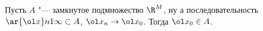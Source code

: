 
	 Пусть $A$ "--- замкнутое подмножество $\R^M$, ну а последовательность $\ar{\ol x}n1\infty\subset A$, $\ol x_n\to \ol x_0$. Тогда
	 $\ol x_0\in A$.
	 